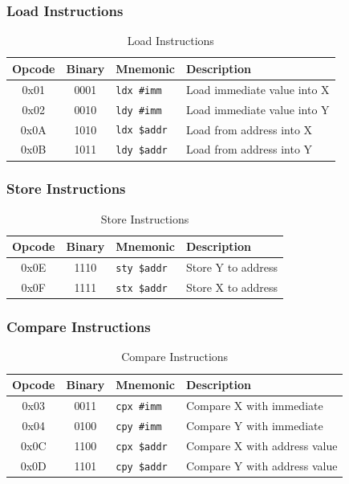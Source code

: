 \documentclass[11pt,a4paper]{article}
\begin{document}
\subsubsection{Load Instructions}

\begin{table}[H]
\centering
\caption{Load Instructions}
\begin{tabular}{@{}cclp{6cm}@{}}
\toprule
\textbf{Opcode} & \textbf{Binary} & \textbf{Mnemonic} & \textbf{Description} \\
\midrule
0x01 & 0001 & \texttt{ldx \#imm} & Load immediate value into X \\
0x02 & 0010 & \texttt{ldy \#imm} & Load immediate value into Y \\
0x0A & 1010 & \texttt{ldx \$addr} & Load from address into X \\
0x0B & 1011 & \texttt{ldy \$addr} & Load from address into Y \\
\bottomrule
\end{tabular}
\end{table}

\subsubsection{Store Instructions}

\begin{table}[H]
\centering
\caption{Store Instructions}
\begin{tabular}{@{}cclp{6cm}@{}}
\toprule
\textbf{Opcode} & \textbf{Binary} & \textbf{Mnemonic} & \textbf{Description} \\
\midrule
0x0E & 1110 & \texttt{sty \$addr} & Store Y to address \\
0x0F & 1111 & \texttt{stx \$addr} & Store X to address \\
\bottomrule
\end{tabular}
\end{table}

\subsubsection{Compare Instructions}

\begin{table}[H]
\centering
\caption{Compare Instructions}
\begin{tabular}{@{}cclp{6cm}@{}}
\toprule
\textbf{Opcode} & \textbf{Binary} & \textbf{Mnemonic} & \textbf{Description} \\
\midrule
0x03 & 0011 & \texttt{cpx \#imm} & Compare X with immediate \\
0x04 & 0100 & \texttt{cpy \#imm} & Compare Y with immediate \\
0x0C & 1100 & \texttt{cpx \$addr} & Compare X with address value \\
0x0D & 1101 & \texttt{cpy \$addr} & Compare Y with address value \\
\bottomrule
\end{tabular}
\end{table}
\end{document}
